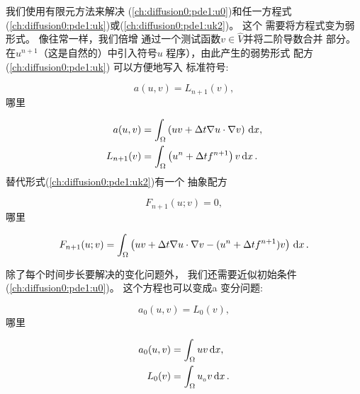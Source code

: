 我们使用有限元方法来解决
(\ref{ch:diffusion0:pde1:u0})和任一方程式
(\ref{ch:diffusion0:pde1:uk})或(\ref{ch:diffusion0:pde1:uk2})。 这个
需要将方程式变为弱形式。 像往常一样，我们倍增
通过一个测试函数$v\in \hat V$并将二阶导数合并
部分。 在$u^{n+1}$（这是自然的）中引入符号$u$
程序），由此产生的弱势形式
配方(\ref{ch:diffusion0:pde1:uk})
可以方便地写入
标准符号:

\[ a(u,v)=L_{n+1}(v),\]
哪里

\begin{align}
a(u,v) &= \int_\Omega\left(uv + {\dt}
\nabla u\cdot \nabla v\right) \dx, \label{ch:diffusion0:pde1:a}\\
L_{n+1}(v) &= \int_\Omega \left(u^n + {\dt}  f^{n+1}\right)v \dx\tp
\label{ch:diffusion0:pde1:L}
\end{align}
替代形式(\ref{ch:diffusion0:pde1:uk2})有一个
抽象配方

\[ F_{n+1}(u;v) = 0,\]
哪里

\begin{equation}
F_{n+1}(u; v) = \int_\Omega \left(uv + {\dt}
\nabla u\cdot \nabla v -
(u^n + {\dt} f^{n+1})v\right) \dx\tp
\label{ch:diffusion0:pde1:F}
\end{equation}

除了每个时间步长要解决的变化问题外，
我们还需要近似初始条件
(\ref{ch:diffusion0:pde1:u0})。 这个方程也可以变成a
变分问题:

\[ a_0(u,v)=L_0(v),\]
哪里

\begin{align}
a_0(u,v) &= \int_\Omega uv \dx, \label{ch:diffusion0:pde1:a0}\\
L_0(v) &= \int_\Omega \uI v \dx\tp \label{ch:diffusion0:pde1:L0}
\end{align}

